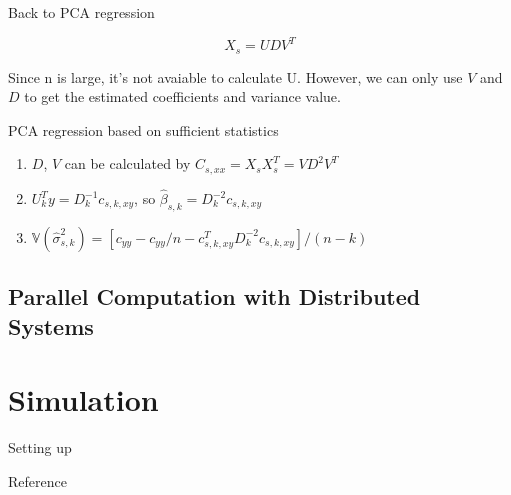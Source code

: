 \documentclass[ignorenonframetext,]{beamer}
\providecommand{\tightlist}{%
  \setlength{\itemsep}{0pt}\setlength{\parskip}{0pt}}
\begin{document}
\begin{frame}{Back to PCA regression}

\[
  X_s = UDV^T
\]

Since n is large, it's not avaiable to calculate U. However, we can only
use \(V\) and \(D\) to get the estimated coefficients and variance
value.

\begin{block}{PCA regression based on sufficient statistics}

\begin{enumerate}
\def\labelenumi{\arabic{enumi}.}
\tightlist
\item
  \(D\), \(V\) can be calculated by \(C_{s, xx} = X_sX_s^T = VD^2V^T\)
\item
  \(U_k^Ty = D^{-1}_kc_{s,k,xy}\), so
  \(\hat{\beta}_{s,k} = D^{-2}_kc_{s,k,xy}\)
\item
  \(\mathbb{V}(\hat{\sigma}_{s,k}^2) = [c_{yy}-c_{yy}/n - c_{s,k,xy}^TD^{-2}_kc_{s,k,xy}]/(n-k)\)
\end{enumerate}

\end{block}

\end{frame}

\subsection{Parallel Computation with Distributed
Systems}\label{parallel-computation-with-distributed-systems}

\section{Simulation}\label{simulation}

\begin{frame}{Setting up}

\end{frame}

\begin{frame}{Reference}

\end{frame}
\end{document}
